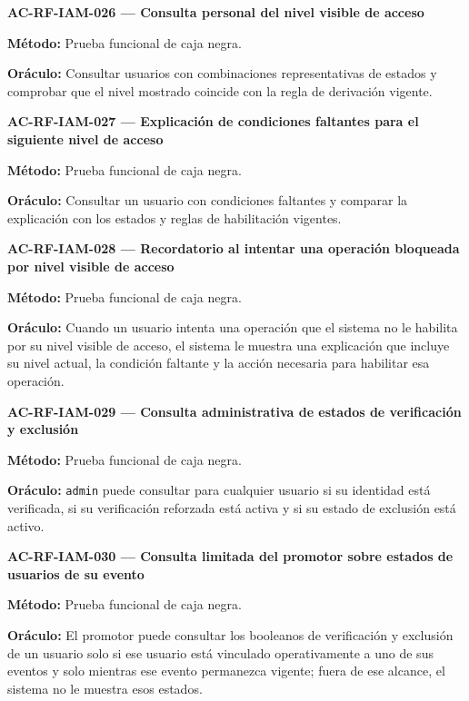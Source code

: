 \documentclass[10pt,letterpaper]{article}
\begin{document}
\noindent\textbf{AC-RF-IAM-026 --- Consulta personal del nivel visible de acceso}\par
\textbf{Método:} Prueba funcional de caja negra.\par
\textbf{Oráculo:} Consultar usuarios con combinaciones representativas de estados y comprobar que el nivel mostrado coincide con la regla de derivación vigente.\par\vspace{0.45em}
\noindent\textbf{AC-RF-IAM-027 --- Explicación de condiciones faltantes para el siguiente nivel de acceso}\par
\textbf{Método:} Prueba funcional de caja negra.\par
\textbf{Oráculo:} Consultar un usuario con condiciones faltantes y comparar la explicación con los estados y reglas de habilitación vigentes.\par\vspace{0.45em}
\noindent\textbf{AC-RF-IAM-028 --- Recordatorio al intentar una operación bloqueada por nivel visible de acceso}\par
\textbf{Método:} Prueba funcional de caja negra.\par
\textbf{Oráculo:} Cuando un usuario intenta una operación que el sistema no le habilita por su nivel visible de acceso, el sistema le muestra una explicación que incluye su nivel actual, la condición faltante y la acción necesaria para habilitar esa operación.\par\vspace{0.45em}
\noindent\textbf{AC-RF-IAM-029 --- Consulta administrativa de estados de verificación y exclusión}\par
\textbf{Método:} Prueba funcional de caja negra.\par
\textbf{Oráculo:} \texttt{admin} puede consultar para cualquier usuario si su identidad está verificada, si su verificación reforzada está activa y si su estado de exclusión está activo.\par\vspace{0.45em}
\noindent\textbf{AC-RF-IAM-030 --- Consulta limitada del promotor sobre estados de usuarios de su evento}\par
\textbf{Método:} Prueba funcional de caja negra.\par
\textbf{Oráculo:} El promotor puede consultar los booleanos de verificación y exclusión de un usuario solo si ese usuario está vinculado operativamente a uno de sus eventos y solo mientras ese evento permanezca vigente; fuera de ese alcance, el sistema no le muestra esos estados.\par\vspace{0.45em}
\end{document}
